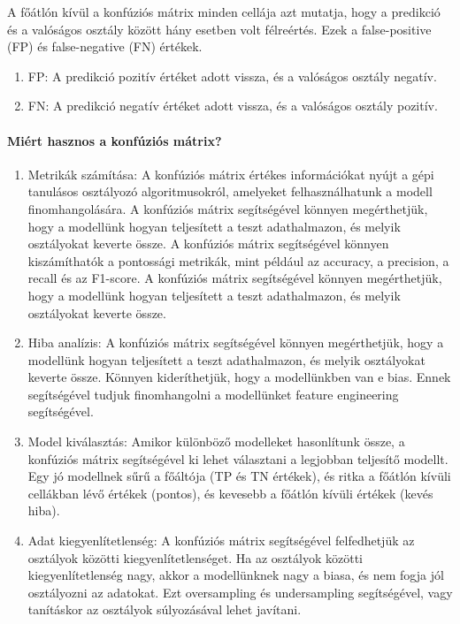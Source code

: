 \documentclass[12pt,a4paper]{article}
\begin{document}
A főátlón kívül a konfúziós mátrix minden cellája azt mutatja, hogy a predikció és a valóságos osztály között hány esetben volt félreértés. Ezek a false-positive (FP) és false-negative (FN) értékek.
\begin{enumerate}
    \item FP: A predikció pozitív értéket adott vissza, és a valóságos osztály negatív.
    \item FN: A predikció negatív értéket adott vissza, és a valóságos osztály pozitív.
\end{enumerate}

\paragraph{Miért hasznos a konfúziós mátrix?}
\begin{enumerate}
    \item Metrikák számítása: A konfúziós mátrix értékes információkat nyújt a gépi tanulásos osztályozó algoritmusokról, amelyeket felhasználhatunk a modell finomhangolására. A konfúziós mátrix segítségével könnyen megérthetjük, hogy a modellünk hogyan teljesített a teszt adathalmazon, és melyik osztályokat keverte össze. A konfúziós mátrix segítségével könnyen kiszámíthatók a pontossági metrikák, mint például az accuracy, a precision, a recall és az F1-score. A konfúziós mátrix segítségével könnyen megérthetjük, hogy a modellünk hogyan teljesített a teszt adathalmazon, és melyik osztályokat keverte össze.
    \item Hiba analízis: A konfúziós mátrix segítségével könnyen megérthetjük, hogy a modellünk hogyan teljesített a teszt adathalmazon, és melyik osztályokat keverte össze. Könnyen kideríthetjük, hogy a modellünkben van e bias. Ennek segítségével tudjuk finomhangolni a modellünket feature engineering segítségével.
    \item Model kiválasztás: Amikor különböző modelleket hasonlítunk össze, a konfúziós mátrix segítségével ki lehet választani a legjobban teljesítő modellt. Egy jó modellnek sűrű a főáltója (TP és TN értékek), és ritka a főátlón kívüli cellákban lévő értékek (pontos), és kevesebb a főátlón kívüli értékek (kevés hiba).
    \item Adat kiegyenlítetlenség: A konfúziós mátrix segítségével felfedhetjük az osztályok közötti kiegyenlítetlenséget. Ha az osztályok közötti kiegyenlítetlenség nagy, akkor a modellünknek nagy a biasa, és nem fogja jól osztályozni az adatokat. Ezt oversampling és undersampling segítségével, vagy tanításkor az osztályok súlyozásával lehet javítani.
\end{enumerate}
\end{document}
